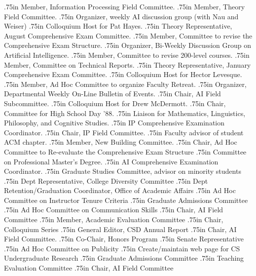 { {.75in}
Member, Information Processing Field Committee.
 {.75in}
Member, Theory Field Committee.
 {.75in}
Organizer, weekly AI discussion group (with Nau and Weiser)
 {.75in}
Colloquium Host for Pat Hayes.
 {.75in}
Theory Representative, August Comprehensive Exam Committee.
 {.75in}
Member, Committee to revise the Comprehensive Exam Structure.
 {.75in}
Organizer, Bi-Weekly Discussion Group on Artificial Intelligence.
 {.75in}
Member, Committee to revise 200-level courses.
 {.75in}
Member, Committee on Technical Reports.
 {.75in}
Theory Representative, January Comprehensive Exam Committee.
 {.75in}
Colloquium Host for Hector Levesque.
 {.75in}
Member, Ad Hoc Committee to organize Faculty Retreat.
 {.75in}
Organizer, Departmental Weekly On-Line Bulletin of Events.
 {.75in}
Chair, AI Field Subcommittee.
 {.75in}
Colloquium Host for Drew McDermott.
 {.75in}
Chair, Committee for High School Day '88.
 {.75in}
Liaison for Mathematics, Linguistics, Philosophy, and Cognitive Studies.
 {.75in}
IP Comprehensive Examination Coordinator.
 {.75in}
Chair, IP Field Committee.
 {.75in}
Faculty advisor of student ACM chapter.
 {.75in}
Member, New Building Committee.
 {.75in}
Chair, Ad Hoc Committee to Re-evaluate the Comprehensive Exam Structure
 {.75in}
Committee on Professional Master's Degree.
 {.75in}
AI Comprehensive Examination Coordinator.
 {.75in}
Graduate Studies Committee, advisor on minority students
 {.75in}
Dept Representative, College Diversity Committee
 {.75in}
Dept Retention/Graduation Coordinator, Office of Academic Affairs
 {.75in}
Ad Hoc Committee on Instructor Tenure Criteria
 {.75in}
Graduate Admissions Committee
 {.75in}
Ad Hoc Committee on Communication Skills
 {.75in}
Chair, AI Field Committee
 {.75in}
Member, Academic Evaluation Committee
 {.75in}
Chair, Colloquium Series
 {.75in}
General Editor, CSD Annual Report
 {.75in}
Chair, AI Field Committee.
 {.75in}
Co-Chair, Honors Program
 {.75in}
Senate Representative
 {.75in}
Ad Hoc Committee on Publicity
 {.75in}
Create/maintain web page for CS Undergraduate Research
 {.75in}
Graduate Admissions Committee
 {.75in}
Teaching Evaluation Committee
 {.75in}
Chair, AI Field Committee

}
